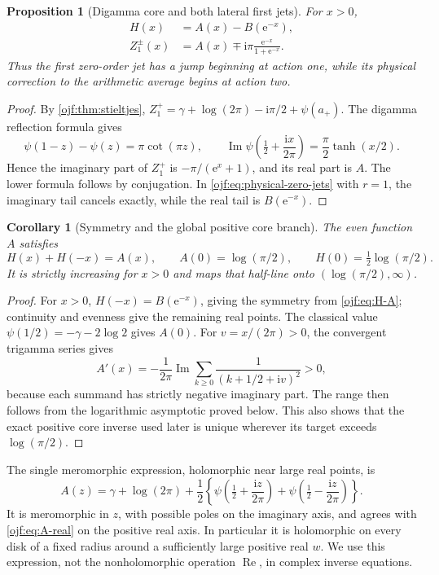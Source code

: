 \documentclass[11pt,a4paper]{article}
\numberwithin{equation}{section}
\newtheorem{proposition}[theorem]{Proposition}
\newtheorem{corollary}[theorem]{Corollary}
\theoremstyle{definition}\newtheorem{definition}[theorem]{Definition}
\theoremstyle{remark}\newtheorem{remark}[theorem]{Remark}
\newcommand{\ee}{\mathrm e}\newcommand{\ii}{\mathrm i}\newcommand{\dd}{\,\mathrm d}
\newcommand{\Rea}{\operatorname{Re}}\newcommand{\Ima}{\operatorname{Im}}
\begin{document}
\begin{proposition}[Digamma core and both lateral first jets]
\label{ojf:prop:digamma}
For $x>0$,
\begin{align}
 H(x)&=A(x)-B(\ee^{-x}),\label{ojf:eq:H-A}\\
 Z_1^\pm(x)&=A(x)\mp\ii\pi\frac{\ee^{-x}}{1+\ee^{-x}}.
                                                        \label{ojf:eq:Z1}
\end{align}
Thus the first zero-order jet has a jump beginning at action one,
while its physical correction to the arithmetic average begins at
action two.
\end{proposition}
\begin{proof}
By \cref{ojf:thm:stieltjes},
$Z_1^+=\gamma+\log(2\pi)-\ii\pi/2+\psi(a_+)$.
The digamma reflection formula \cite[\S5.5]{DLMFgamma} gives
\[
 \psi(1-z)-\psi(z)=\pi\cot(\pi z),\qquad
 \Ima\psi\left(\tfrac12+\frac{\ii x}{2\pi}\right)
                =\frac\pi2\tanh(x/2).
\]
Hence the imaginary part of $Z_1^+$ is $-\pi/(\ee^x+1)$, and
its real part is $A$. The lower formula follows by conjugation.
In \eqref{ojf:eq:physical-zero-jets} with $r=1$, the imaginary tail
cancels exactly, while the real tail is $B(\ee^{-x})$.
\end{proof}

\begin{corollary}[Symmetry and the global positive core branch]
\label{ojf:cor:core-global}
The even function $A$ satisfies
\[
 H(x)+H(-x)=A(x),\qquad A(0)=\log(\pi/2),
 \qquad H(0)=\tfrac12\log(\pi/2).
\]
It is strictly increasing for $x>0$ and maps that half-line onto
$(\log(\pi/2),\infty)$.
\end{corollary}
\begin{proof}
For $x>0$, $H(-x)=B(\ee^{-x})$, giving the symmetry from
\eqref{ojf:eq:H-A}; continuity and evenness give the remaining real
points. The classical value $\psi(1/2)=-\gamma-2\log2$ gives $A(0)$.
For $v=x/(2\pi)>0$, the convergent trigamma series gives
\[
 A'(x)=-\frac1{2\pi}\Ima\sum_{k\ge0}\frac1{(k+1/2+\ii v)^2}>0,
\]
because each summand has strictly negative imaginary part. The range
then follows from the logarithmic asymptotic proved below. This also
shows that the exact positive core inverse used later is unique wherever
its target exceeds $\log(\pi/2)$.
\end{proof}

The single meromorphic expression, holomorphic near large real points, is
\begin{equation}\label{ojf:eq:A-holomorphic}
 A(z)=\gamma+\log(2\pi)+\frac12
    \left\{\psi\left(\tfrac12+\frac{\ii z}{2\pi}\right)
          +\psi\left(\tfrac12-\frac{\ii z}{2\pi}\right)\right\}.
\end{equation}
It is meromorphic in $z$, with possible poles on the imaginary axis,
and agrees with \eqref{ojf:eq:A-real} on the positive real axis. In
particular it is holomorphic on every disk of a fixed radius around a
sufficiently large positive real $w$. We use this expression, not the
nonholomorphic operation $\Rea$, in complex inverse equations.
\end{document}
